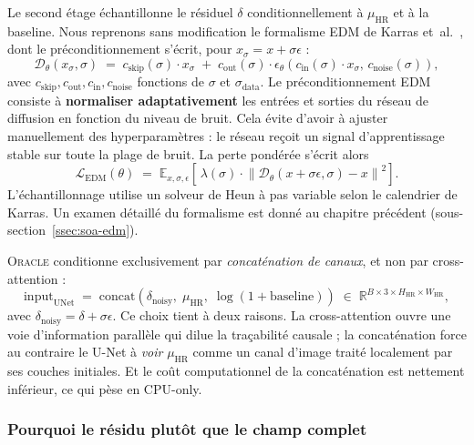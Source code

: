 \documentclass[14pt,a4paper,openany]{extreport}
\theoremstyle{definition}
\newcommand{\Oracle}{\textsc{Oracle}}
\newcommand{\HR}{\ensuremath{\text{HR}}}
\newcommand{\muHR}{\ensuremath{\mu_{\HR}}}
\newcommand{\LEDM}{\ensuremath{\mathcal{L}_{\mathrm{EDM}}}}
\begin{document}
Le second étage échantillonne le résiduel $\delta$ conditionnellement à $\muHR$ et à la baseline. Nous reprenons sans modification le formalisme EDM de Karras et~al.~\cite{karras_edm_2022}, dont le préconditionnement s'écrit, pour $x_\sigma = x + \sigma \epsilon$ :
\begin{equation}
  \mathcal{D}_\theta(x_\sigma, \sigma) \;=\; c_{\mathrm{skip}}(\sigma) \cdot x_\sigma \;+\; c_{\mathrm{out}}(\sigma) \cdot \epsilon_\theta\!\left( c_{\mathrm{in}}(\sigma) \cdot x_\sigma,\, c_{\mathrm{noise}}(\sigma) \right),
  \label{eq:edm-precond}
\end{equation}
avec $c_{\mathrm{skip}}, c_{\mathrm{out}}, c_{\mathrm{in}}, c_{\mathrm{noise}}$ fonctions de $\sigma$ et $\sigma_{\mathrm{data}}$. Le préconditionnement EDM consiste à \textbf{normaliser adaptativement} les entrées et sorties du réseau de diffusion en fonction du niveau de bruit. Cela évite d'avoir à ajuster manuellement des hyperparamètres : le réseau reçoit un signal d'apprentissage stable sur toute la plage de bruit. La perte pondérée s'écrit alors
\begin{equation}
  \LEDM(\theta) \;=\; \mathbb{E}_{x, \sigma, \epsilon}\!\left[\, \lambda(\sigma) \cdot \left\| \mathcal{D}_\theta\!\left( x + \sigma \epsilon, \sigma \right) - x \right\|^2 \right].
  \label{eq:edm-loss}
\end{equation}
L'échantillonnage utilise un solveur de Heun à pas variable selon le calendrier de Karras. Un examen détaillé du formalisme est donné au chapitre précédent (sous-section~\ref{ssec:soa-edm}).

\Oracle{} conditionne exclusivement par \emph{concaténation de canaux}, et non par cross-attention :
\begin{equation}
  \mathrm{input}_{\mathrm{UNet}} \;=\; \mathrm{concat}\!\left( \delta_{\mathrm{noisy}},\; \muHR,\; \log(1 + \mathrm{baseline}) \right) \;\in\; \mathbb{R}^{B \times 3 \times H_{\HR} \times W_{\HR}},
  \label{eq:causal-concat}
\end{equation}
avec $\delta_{\mathrm{noisy}} = \delta + \sigma \epsilon$. Ce choix tient à deux raisons. La cross-attention ouvre une voie d'information parallèle qui dilue la traçabilité causale ; la concaténation force au contraire le U-Net à \emph{voir} $\muHR$ comme un canal d'image traité localement par ses couches initiales. Et le coût computationnel de la concaténation est nettement inférieur, ce qui pèse en CPU-only.

\subsubsection{Pourquoi le résidu plutôt que le champ complet}
\label{ssec:oracle-residu-justif}
\end{document}
